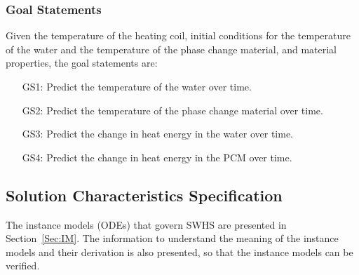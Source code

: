 \documentclass[12pt]{article}
\begin{document}
\subsubsection{Goal Statements}
\label{Sec:GSs}
Given the temperature of the heating coil, initial conditions for the temperature of the water and the temperature of the phase change material, and material properties, the goal statements are:
\begin{itemize}
\item[GS1:]Predict the temperature of the water over time.
\item[GS2:]Predict the temperature of the phase change material over time.
\item[GS3:]Predict the change in heat energy in the water over time.
\item[GS4:]Predict the change in heat energy in the PCM over time.
\end{itemize}
\subsection{Solution Characteristics Specification}
\label{Sec:SCS}
The instance models (ODEs) that govern SWHS are presented in Section~\ref{Sec:IM}. The information to understand the meaning of the instance models and their derivation is also presented, so that the instance models can be verified.
\end{document}
